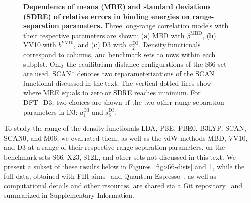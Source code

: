 \begin{figure}
{
}
\caption{\textbf{Dependence of means (MRE) and standard deviations (SDRE) of relative errors in binding energies on range-separation parameters.}
Three long-range correlation models with their respective parameters are shown: (\textbf a) MBD with $\beta^\text{MBD}$, (\textbf b) VV10 with $b^\text{VV10}$, and (\textbf c) D3 with $a_2^\text{D3}$.
Density functionals correspond to columns, and benchmark sets to rows within each subplot.
Only the equilibrium-distance configurations of the S66 set are used.
SCAN* denotes two reparameterizations of the SCAN functional discussed in the text. %
The vertical dotted lines show where MRE equals to zero or SDRE reaches minimum.
For DFT+D3, two choices are shown of the two other range-separation parameters in D3: $a_1^\text{D3}$ and $s_8^\text{D3}$.
}\label{fig:param-fitting}
\end{figure}

To study the range of the density functionals LDA, PBE, PBE0, B3LYP, SCAN, SCAN0, and M06, we evaluated them, as well as the vdW methods MBD, VV10, and D3 at a range of their respective range-separation parameters, on the benchmark sets S66, X23, S12L, and other sets not discussed in this text.
We present a subset of these results below in Figures~\ref{fig:s66-dists} and~\ref{fig:param-fitting}, while the full data, obtained with FHI-aims~\cite{BlumCPC09} and Quantum Espresso~\cite{GiannozziJPCM09,HamannPRB13}, as well as computational details and other resources, are shared via a Git repository~\cite{GitRepo} and summarized in Supplementary Information.


